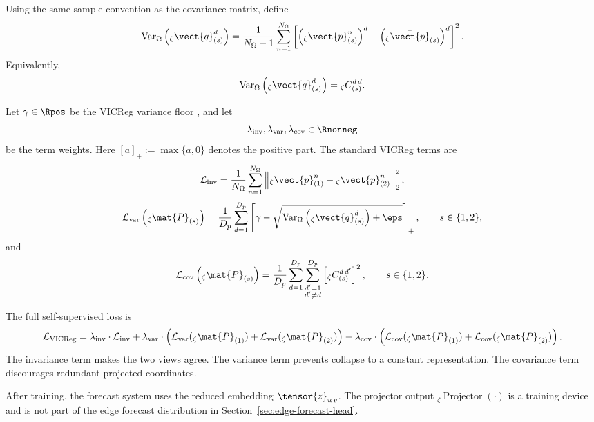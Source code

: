 Using the same sample convention as the covariance matrix, define
\[
  \operatorname{Var}_{\Omega}
  \left(
    {}_{\zeta}\vect{q}_{(s)}^{d}
  \right)
  =
  \frac{1}{N_{\Omega}-1}
  \sum_{n=1}^{N_{\Omega}}
  \left[
    \left(
      {}_{\zeta}\vect{p}_{(s)}^{n}
    \right)^{d}
    -
    \left(
      {}_{\zeta}\bar{\vect{p}}_{(s)}
    \right)^{d}
  \right]^2.
\]
Equivalently,
\[
  \operatorname{Var}_{\Omega}
  \left(
    {}_{\zeta}\vect{q}_{(s)}^{d}
  \right)
  =
  {}_{\zeta}C_{(s)}^{d\,d}.
\]

Let $\gamma\in\Rpos$ be the VICReg variance floor%
,
and let
\[
  \lambda_{\mathrm{inv}},
  \lambda_{\mathrm{var}},
  \lambda_{\mathrm{cov}}
  \in
  \Rnonneg
\]
be the term weights.  Here $[a]_+:=\max\{a,0\}$ denotes the positive part.  The
standard VICReg terms%
are
\[
  \mathcal{L}_{\mathrm{inv}}
  =
  \frac{1}{N_{\Omega}}
  \sum_{n=1}^{N_{\Omega}}
  \left\|
    {}_{\zeta}\vect{p}_{(1)}^{n}
    -
    {}_{\zeta}\vect{p}_{(2)}^{n}
  \right\|_2^2,
\]
\[
  \mathcal{L}_{\mathrm{var}}
  \left(
    {}_{\zeta}\mat{P}_{(s)}
  \right)
  =
  \frac{1}{D_p}
  \sum_{d=1}^{D_p}
  \left[
    \gamma
    -
    \sqrt{
      \operatorname{Var}_{\Omega}
      \left(
        {}_{\zeta}\vect{q}_{(s)}^{d}
      \right)
      +
      \eps
    }
  \right]_+,
  \qquad
  s\in\{1,2\},
\]
and
\[
  \mathcal{L}_{\mathrm{cov}}
  \left(
    {}_{\zeta}\mat{P}_{(s)}
  \right)
  =
  \frac{1}{D_p}
  \sum_{d=1}^{D_p}
  \sum_{\substack{d'=1\\d'\ne d}}^{D_p}
  \left[
    {}_{\zeta}C_{(s)}^{d\,d'}
  \right]^2,
  \qquad
  s\in\{1,2\}.
\]

The full self-supervised loss is
\[
  \mathcal{L}_{\mathrm{VICReg}}
  =
  \lambda_{\mathrm{inv}}\cdot\mathcal{L}_{\mathrm{inv}}
  +
  \lambda_{\mathrm{var}}\cdot
  \left(
    \mathcal{L}_{\mathrm{var}}({}_{\zeta}\mat{P}_{(1)})
    +
    \mathcal{L}_{\mathrm{var}}({}_{\zeta}\mat{P}_{(2)})
  \right)
  +
  \lambda_{\mathrm{cov}}\cdot
  \left(
    \mathcal{L}_{\mathrm{cov}}({}_{\zeta}\mat{P}_{(1)})
    +
    \mathcal{L}_{\mathrm{cov}}({}_{\zeta}\mat{P}_{(2)})
  \right).
\]
The invariance term makes the two views agree.  The variance term prevents
collapse to a constant representation.  The covariance term discourages
redundant projected coordinates.

After training, the forecast system uses the reduced embedding
$\tensor{z}_{u\,v}$.  The projector output
${}_{\zeta}\operatorname{Projector}(\cdot)$ is a training device and is not part
of the edge forecast distribution in Section~\ref{sec:edge-forecast-head}.